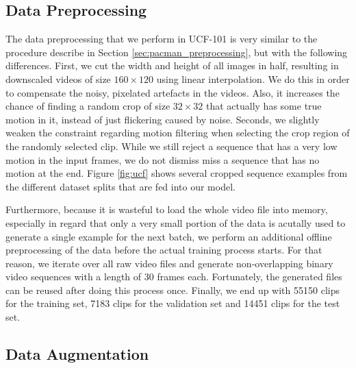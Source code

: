 \subsection{Data Preprocessing}

The data preprocessing that we perform in UCF-101 is very similar to the procedure describe in Section \ref{sec:pacman_preprocessing}, but with the following differences. First, we cut the width and height of all images in half, resulting in downscaled videos of size $160 \times 120$ using linear interpolation. We do this in order to compensate the noisy, pixelated artefacts in the videos. Also, it increases the chance of finding a random crop of size $ 32 \times 32 $ that actually has some true motion in it, instead of just flickering caused by noise. Seconds, we slightly weaken the constraint regarding motion filtering when selecting the crop region of the randomly selected clip. While we still reject a sequence that has a very low motion in the input frames, we do not dismiss miss a sequence that has no motion at the end. Figure \ref{fig:ucf} shows several cropped sequence examples from the different dataset splits that are fed into our model.

Furthermore, because it is wasteful to load the whole video file into memory, especially in regard that only a very small portion of the data is acutally used to generate a single example for the next batch, we perform an additional offline preprocessing of the data before the actual training process starts. For that reason, we iterate over all raw video files and generate non-overlapping binary video sequences with a length of \num{30} frames each. Fortunately, the generated files can be reused after doing this process once. Finally, we end up with \num{55150} clips for the training set, \num{7183} clips for the validation set and \num{14451} clips for the test set.

\subsection{Data Augmentation}


